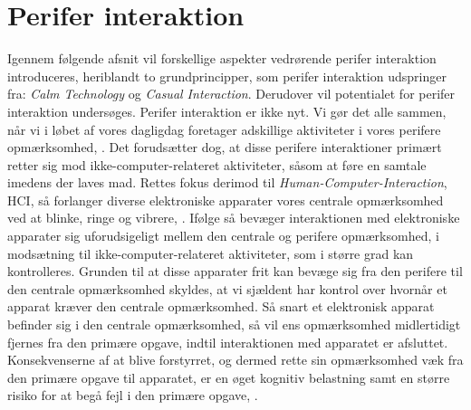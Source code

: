 \section{Perifer interaktion}
\label{PeriferInteratkion}
%
Igennem følgende afsnit vil forskellige aspekter vedrørende perifer interaktion introduceres, heriblandt to grundprincipper, som perifer interaktion udspringer fra: \textit{Calm Technology} og \textit{Casual Interaction}. Derudover vil potentialet for perifer interaktion undersøges.\blankline
%
Perifer interaktion er ikke nyt. Vi gør det alle sammen, når vi i løbet af vores dagligdag foretager adskillige aktiviteter i vores perifere opmærksomhed, \parencite[s. 1]{PDF:PIIntroduction}. Det forudsætter dog, at disse perifere interaktioner primært retter sig mod ikke-computer-relateret aktiviteter, såsom at føre en samtale imedens der laves mad. Rettes fokus derimod til \textit{Human-Computer-Interaction}, HCI, så forlanger diverse elektroniske apparater vores centrale opmærksomhed ved at blinke, ringe og vibrere, \parencite[s. 1]{PDF:PIIntroduction}. Ifølge \textcite[s. 3]{PDF:PIIntroduction} så bevæger interaktionen med elektroniske apparater sig uforudsigeligt mellem den centrale og perifere opmærksomhed, i modsætning til ikke-computer-relateret aktiviteter, som i større grad kan kontrolleres. Grunden til at disse apparater frit kan bevæge sig fra den perifere til den centrale opmærksomhed skyldes, at vi sjældent har kontrol over hvornår et apparat kræver den centrale opmærksomhed. Så snart et elektronisk apparat befinder sig i den centrale opmærksomhed, så vil ens opmærksomhed midlertidigt fjernes fra den primære opgave, indtil interaktionen med apparatet er afsluttet. Konsekvenserne af at blive forstyrret, og dermed rette sin opmærksomhed væk fra den primære opgave til apparatet, er en øget kognitiv belastning samt en større risiko for at begå fejl i den primære opgave, \parencite[ss. 188-189][s. 162]{PDF:PIDesktopComputingKap9, PDF:ComparingInputModalities}. 

